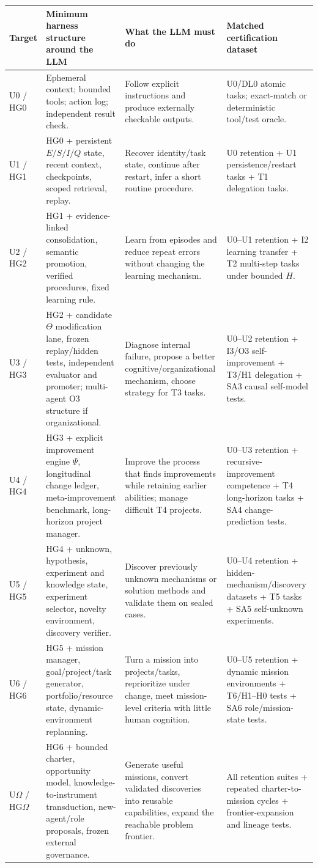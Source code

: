 \documentclass[11pt]{article}
\theoremstyle{definition}
\newcommand{\Om}{\ensuremath{\Omega}}
\begin{document}
\begin{table}[h]
\centering\scriptsize
\begin{tabularx}{\textwidth}{@{}p{}ZZZ@{}}
\toprule
Target & Minimum harness structure around the LLM & What the LLM must do & Matched certification dataset \\
\midrule
U0 / HG0 & Ephemeral context; bounded tools; action log; independent result check. & Follow explicit instructions and produce externally checkable outputs. & U0/DL0 atomic tasks; exact-match or deterministic tool/test oracle. \\
U1 / HG1 & HG0 + persistent $E/S/I/Q$ state, recent context, checkpoints, scoped retrieval, replay. & Recover identity/task state, continue after restart, infer a short routine procedure. & U0 retention + U1 persistence/restart tasks + T1 delegation tasks. \\
U2 / HG2 & HG1 + evidence-linked consolidation, semantic promotion, verified procedures, fixed learning rule. & Learn from episodes and reduce repeat errors without changing the learning mechanism. & U0--U1 retention + I2 learning transfer + T2 multi-step tasks under bounded $H$. \\
U3 / HG3 & HG2 + candidate $\Theta$ modification lane, frozen replay/hidden tests, independent evaluator and promoter; multi-agent O3 structure if organizational. & Diagnose internal failure, propose a better cognitive/organizational mechanism, choose strategy for T3 tasks. & U0--U2 retention + I3/O3 self-improvement + T3/H1 delegation + SA3 causal self-model tests. \\
U4 / HG4 & HG3 + explicit improvement engine $\Psi$, longitudinal change ledger, meta-improvement benchmark, long-horizon project manager. & Improve the process that finds improvements while retaining earlier abilities; manage difficult T4 projects. & U0--U3 retention + recursive-improvement competence + T4 long-horizon tasks + SA4 change-prediction tests. \\
U5 / HG5 & HG4 + unknown, hypothesis, experiment and knowledge state, experiment selector, novelty environment, discovery verifier. & Discover previously unknown mechanisms or solution methods and validate them on sealed cases. & U0--U4 retention + hidden-mechanism/discovery datasets + T5 tasks + SA5 self-unknown experiments. \\
U6 / HG6 & HG5 + mission manager, goal/project/task generator, portfolio/resource state, dynamic-environment replanning. & Turn a mission into projects/tasks, reprioritize under change, meet mission-level criteria with little human cognition. & U0--U5 retention + dynamic mission environments + T6/H1--H0 tests + SA6 role/mission-state tests. \\
U\Om{} / HG\Om{} & HG6 + bounded charter, opportunity model, knowledge-to-instrument transduction, new-agent/role proposals, frozen external governance. & Generate useful missions, convert validated discoveries into reusable capabilities, expand the reachable problem frontier. & All retention suites + repeated charter-to-mission cycles + frontier-expansion and lineage tests. \\
\bottomrule
\end{tabularx}
\end{table}
\end{document}

